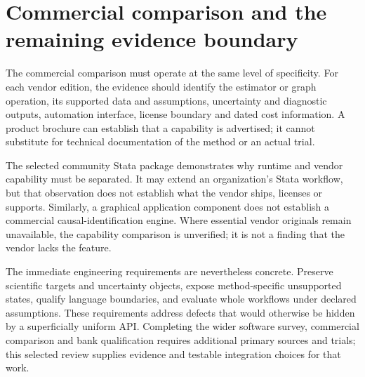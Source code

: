 \section{Commercial comparison and the remaining evidence boundary}

The commercial comparison must operate at the same level of specificity.
For each vendor edition, the evidence should identify the estimator or graph
operation, its supported data and assumptions, uncertainty and diagnostic
outputs, automation interface, license boundary and dated cost information.
A product brochure can establish that a capability is advertised; it cannot
substitute for technical documentation of the method or an actual trial.

The selected community Stata package demonstrates why runtime and vendor
capability must be separated. It may extend an organization's Stata workflow,
but that observation does not establish what the vendor ships, licenses or
supports. Similarly, a graphical application component does not establish a
commercial causal-identification engine. Where essential vendor originals
remain unavailable, the capability comparison is unverified; it is not a
finding that the vendor lacks the feature.

The immediate engineering requirements are nevertheless concrete. Preserve
scientific targets and uncertainty objects, expose method-specific unsupported
states, qualify language boundaries, and evaluate whole workflows under
declared assumptions. These requirements address defects that would otherwise
be hidden by a superficially uniform API. Completing the wider software
survey, commercial comparison and bank qualification requires additional
primary sources and trials; this selected review supplies evidence and
testable integration choices for that work.

